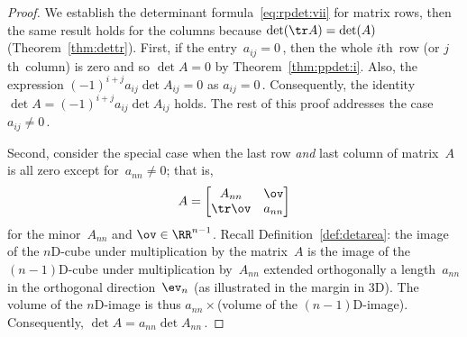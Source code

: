 \begin{proof} 
We establish the determinant formula~\eqref{eq:rpdet:vii} for matrix rows,  then the same result holds for the columns because \(\det(\tr A)=\det(A)\) (Theorem~\ref{thm:dettr}).
First, if the entry~\(a_{ij}=0\)\,, then the whole \(i\)th~row (or \(j\)th~column) is zero and so \(\det A=0\) by Theorem~\ref{thm:ppdet:i}.  
Also, the expression \((-1)^{i+j}a_{ij}\det A_{ij}=0\) as \(a_{ij}=0\)\,.  
Consequently, the identity \(\det A=(-1)^{i+j}a_{ij}\det A_{ij}\) holds.
The rest of this proof addresses the case \(a_{ij}\neq 0\)\,.

Second, consider the special case when the last row \emph{and} last column of matrix~\(A\) is all zero except for~\(a_{nn}\neq0\); that is, 
\begin{equation*}
A=\begin{bmatrix} A_{nn}&\ov\\\tr\ov&a_{nn} \end{bmatrix}
\end{equation*}
for the minor~\(A_{nn}\) and \(\ov\in\RR^{n-1}\).
Recall Definition~\ref{def:detarea}: the image of the \(n\)D-cube under multiplication by the matrix~\(A\) is the image of the \((n-1)\)D-cube under multiplication by~\(A_{nn}\) extended orthogonally a length~\(a_{nn}\) in the orthogonal direction~\(\ev_n\) (as illustrated in the margin in 3D).
The volume of the \(n\)D-image is thus \(a_{nn}\times{}\)(volume of the \((n-1)\)D-image).
Consequently, \(\det A=a_{nn}\det A_{nn}\)\,.


\end{proof}
